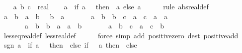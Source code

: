 \begin{isabellebody}
\isanewline
{}\isamarkupfalse%
\isanewline
%
\isadelimproof
%
\endisadelimproof
%
\isatagproof
{}\isamarkupfalse%
\isanewline
\ \ \isamarkupfalse%
\ a\ b\ c\ {\isacharcolon}{\kern0pt}{\isacharcolon}{\kern0pt}\ real\isanewline
\ \ \isamarkupfalse%
\ {\isachardoublequoteopen}{\isasymbar}a{\isasymbar}\ {\isacharequal}{\kern0pt}\ {\isacharparenleft}{\kern0pt}if\ a\ {\isacharless}{\kern0pt}\ {}\ then\ {\isacharminus}{\kern0pt}\ a\ else\ a{\isacharparenright}{\kern0pt}{\isachardoublequoteclose}\isanewline
\ \ \ \ \isamarkupfalse%
\ {\isacharparenleft}{\kern0pt}rule\ abs{\isacharunderscore}{\kern0pt}real{\isacharunderscore}{\kern0pt}def{\isacharparenright}{\kern0pt}\isanewline
\ \ \isamarkupfalse%
\ {\isachardoublequoteopen}a\ {\isacharless}{\kern0pt}\ b\ {\isasymlongleftrightarrow}\ a\ {\isasymle}\ b\ {\isasymand}\ {\isasymnot}\ b\ {\isasymle}\ a{\isachardoublequoteclose}\isanewline
\ \ \ \ \ \ \ {\isachardoublequoteopen}a\ {\isasymle}\ b\ {\isasymLongrightarrow}\ b\ {\isasymle}\ c\ {\isasymLongrightarrow}\ a\ {\isasymle}\ c{\isachardoublequoteclose}\ \ {\isachardoublequoteopen}a\ {\isasymle}\ a{\isachardoublequoteclose}\ \isanewline
\ \ \ \ \ \ \ {\isachardoublequoteopen}a\ {\isasymle}\ b\ {\isasymLongrightarrow}\ b\ {\isasymle}\ a\ {\isasymLongrightarrow}\ a\ {\isacharequal}{\kern0pt}\ b{\isachardoublequoteclose}\isanewline
\ \ \ \ \ \ \ {\isachardoublequoteopen}a\ {\isasymle}\ b\ {\isasymLongrightarrow}\ c\ {\isacharplus}{\kern0pt}\ a\ {\isasymle}\ c\ {\isacharplus}{\kern0pt}\ b{\isachardoublequoteclose}\isanewline
\ \ \ \ \isamarkupfalse%
\ less{\isacharunderscore}{\kern0pt}eq{\isacharunderscore}{\kern0pt}real{\isacharunderscore}{\kern0pt}def\ less{\isacharunderscore}{\kern0pt}real{\isacharunderscore}{\kern0pt}def\isanewline
\ \ \ \ \isamarkupfalse%
\ {\isacharparenleft}{\kern0pt}force\ simp\ add{\isacharcolon}{\kern0pt}\ positive{\isacharunderscore}{\kern0pt}zero\ dest{\isacharcolon}{\kern0pt}\ positive{\isacharunderscore}{\kern0pt}add{\isacharparenright}{\kern0pt}{\isacharplus}{\kern0pt}\isanewline
\ \ \isamarkupfalse%
\ {\isachardoublequoteopen}sgn\ a\ {\isacharequal}{\kern0pt}\ {\isacharparenleft}{\kern0pt}if\ a\ {\isacharequal}{\kern0pt}\ {}\ then\ {}\ else\ if\ {}\ {\isacharless}{\kern0pt}\ a\ then\ {}\ else\ {\isacharminus}{\kern0pt}\ {}{\isacharparenright}{\kern0pt}{\isachardoublequoteclose}\isanewline
\ \ \ \ \isamarkupfalse%

\end{isabellebody}
